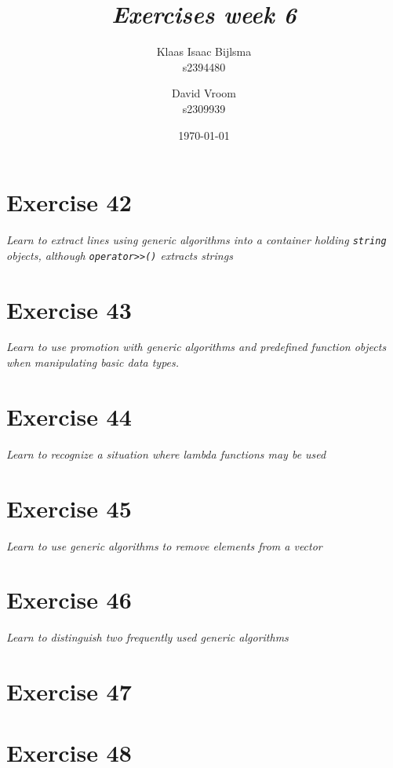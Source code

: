 \documentclass[12pt]{article}
\title{\itshape Exercises week 6}
\author{
	Klaas Isaac Bijlsma \\ s2394480
	\and
	David Vroom \\ s2309939
}
\date{\today}
\newcommand{\desc}[1]{\textit{#1} \vspace{1em}}
\begin{document}
\maketitle

\section*{Exercise 42}
\desc{Learn to extract lines using generic algorithms into a container holding \texttt{string} objects, although \texttt{operator>>()} extracts strings}



\clearpage

\section*{Exercise 43}
\desc{Learn to use promotion with generic algorithms and predefined function objects when manipulating basic data types.}



\clearpage

\section*{Exercise 44}
\desc{Learn to recognize a situation where lambda functions may be used}











\clearpage

\section*{Exercise 45}
\desc{Learn to use generic algorithms to remove elements from a vector}

\clearpage

\section*{Exercise 46}
\desc{Learn to distinguish two frequently used generic algorithms}



\clearpage

\section*{Exercise 47}
\desc{}

\clearpage

\section*{Exercise 48}
\desc{}

\clearpage
\end{document}
